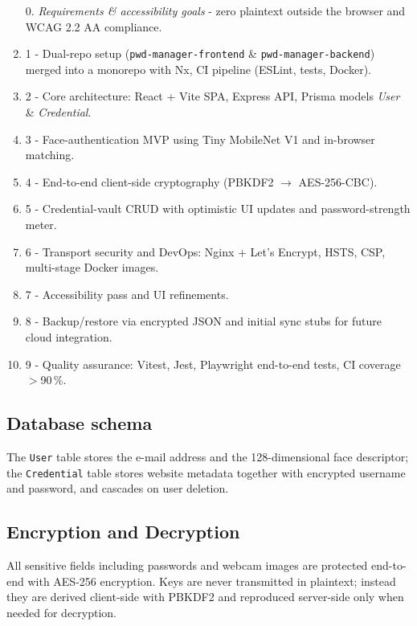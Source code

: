 \begin{enumerate}[label=\textbf{Phase~\arabic*:}, leftmargin=2.5em]
  \item[0.] \emph{Requirements \& accessibility goals} - zero plaintext outside the browser and WCAG 2.2 AA compliance.%
  \item 1 - Dual-repo setup (\texttt{pwd-manager-frontend} \& \texttt{pwd-manager-backend}) merged into a monorepo with Nx, CI pipeline (ESLint, tests, Docker).%
  \item 2 - Core architecture: React + Vite SPA, Express API, Prisma models \emph{User} \& \emph{Credential}.%
  \item 3 - Face-authentication MVP using Tiny MobileNet V1 and in-browser matching.%
  \item 4 - End-to-end client-side cryptography (PBKDF2 $\rightarrow$ AES-256-CBC).%
  \item 5 - Credential-vault CRUD with optimistic UI updates and password-strength meter.%
  \item 6 - Transport security and DevOps: Nginx + Let's Encrypt, HSTS, CSP, multi-stage Docker images.%
  \item 7 - Accessibility pass and UI refinements.%
  \item 8 - Backup/restore via encrypted JSON and initial sync stubs for future cloud integration.%
  \item 9 - Quality assurance: Vitest, Jest, Playwright end-to-end tests, CI coverage $>$90\,\%.%
\end{enumerate}


\subsection{Database schema}
The \texttt{User} table stores the e-mail address and the 128-dimensional face descriptor; the \texttt{Credential} table stores website metadata together with encrypted username and password, and cascades on user deletion.


\subsection{Encryption and Decryption}\label{subsec:encryption}

All sensitive fields including passwords and webcam images are protected end-to-end with AES-256 encryption.
Keys are never transmitted in plaintext; instead they are derived client-side with PBKDF2 and reproduced server-side only when needed for decryption.

